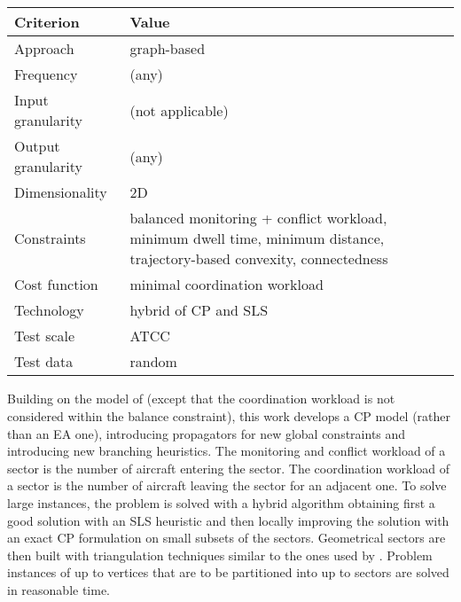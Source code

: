 \documentclass[a4paper,12pt]{article}
\begin{document}
\subsection{\cite{TranDac:RAIRO05}}

\begin{center}
\begin{tabular}{|l|l|}
  \hline
  Criterion & Value \\
  \hline\hline
  Approach & graph-based \\ \hline
  Frequency & (any) \\ \hline
  Input granularity & (not applicable) \\ \hline
  Output granularity & (any) \\ \hline
  Dimensionality & 2D \\ \hline
  Constraints & \parbox{11.5cm}{balanced monitoring + conflict
    workload, minimum dwell time, minimum distance,
    trajectory-based convexity, connectedness} \\ \hline
  Cost function & minimal coordination workload \\ \hline
  Technology & hybrid of CP and SLS \\ \hline
  Test scale & ATCC \\ \hline
  Test data & random \\ \hline
\end{tabular}
\end{center}
Building on the model of \cite{Delahaye:ICEC98} (except that the
coordination workload is not considered within the balance
constraint), this work develops a CP model (rather than an EA one),
introducing propagators for new global constraints and introducing new
branching heuristics.  The monitoring and conflict workload of a
sector is the number of aircraft entering the sector.  The
coordination workload of a sector is the number of aircraft leaving
the sector for an adjacent one.  To solve large instances, the problem
is solved with a hybrid algorithm obtaining first a good solution with
an SLS heuristic and then locally improving the solution with an exact
CP formulation on small subsets of the sectors.  Geometrical sectors
are then built with triangulation techniques similar to the ones used
by \cite{Delahaye:ICEC98}.  Problem instances of up to  vertices
that are to be partitioned into up to  sectors are solved in
reasonable time.

\subsection{\cite{Bichot:ATM07}}
\end{document}
